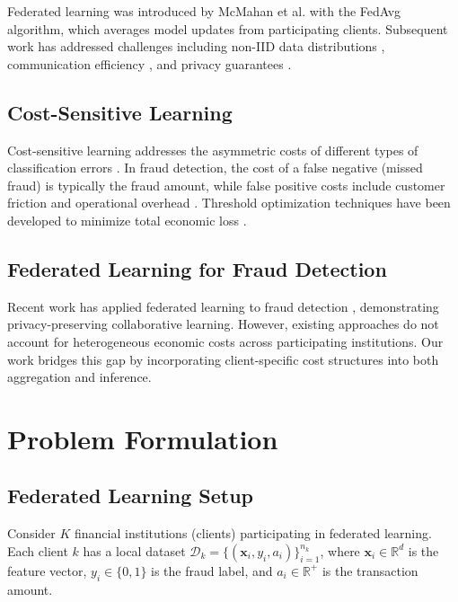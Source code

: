 \documentclass[conference]{IEEEtran}
\begin{document}
Federated learning was introduced by McMahan et al. \cite{mcmahan2017communication} with the FedAvg algorithm, which averages model updates from participating clients. Subsequent work has addressed challenges including non-IID data distributions \cite{li2020federated}, communication efficiency \cite{konevcny2016federated}, and privacy guarantees \cite{geyer2017differentially}.

\subsection{Cost-Sensitive Learning}

Cost-sensitive learning addresses the asymmetric costs of different types of classification errors \cite{elkan2001foundations}. In fraud detection, the cost of a false negative (missed fraud) is typically the fraud amount, while false positive costs include customer friction and operational overhead \cite{bahnsen2014example}. Threshold optimization techniques have been developed to minimize total economic loss \cite{bahnsen2016example}.

\subsection{Federated Learning for Fraud Detection}

Recent work has applied federated learning to fraud detection \cite{yang2019federated}, demonstrating privacy-preserving collaborative learning. However, existing approaches do not account for heterogeneous economic costs across participating institutions. Our work bridges this gap by incorporating client-specific cost structures into both aggregation and inference.

\section{Problem Formulation}
\label{sec:problem}

\subsection{Federated Learning Setup}

Consider $K$ financial institutions (clients) participating in federated learning. Each client $k$ has a local dataset $\mathcal{D}_k = \{(\mathbf{x}_i, y_i, a_i)\}_{i=1}^{n_k}$, where $\mathbf{x}_i \in \mathbb{R}^d$ is the feature vector, $y_i \in \{0, 1\}$ is the fraud label, and $a_i \in \mathbb{R}^+$ is the transaction amount.
\end{document}
